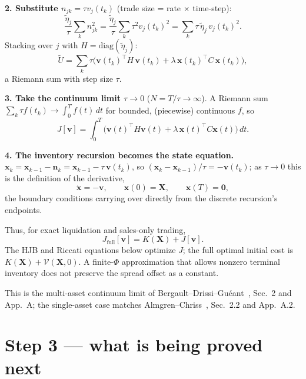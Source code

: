 \documentclass[11pt,a4paper]{article}
\begin{document}
\textbf{2. Substitute $n_{jk}=\tau v_j(t_k)$} (trade size = rate $\times$
time-step):
\[
\frac{\tilde\eta_j}{\tau}\sum_kn_{jk}^2=\frac{\tilde\eta_j}{\tau}\sum_k\tau^2
v_j(t_k)^2=\sum_k\tau\,\tilde\eta_j\,v_j(t_k)^2 .
\]
Stacking over $j$ with $H=\mathrm{diag}(\tilde\eta_j)$:
\[
\tilde U=\sum_k\tau\Big(\mathbf v(t_k)^\top H\,\mathbf v(t_k)+\lambda\,\mathbf
x(t_k)^\top C\,\mathbf x(t_k)\Big),
\]
a Riemann sum with step size $\tau$.

\textbf{3. Take the continuum limit $\tau\to0$} ($N=T/\tau\to\infty$). A
Riemann sum $\sum_k\tau f(t_k)\to\int_0^Tf(t)\,dt$ for bounded, (piecewise)
continuous $f$, so
\begin{equation}
J[\mathbf v]=\int_0^T\big(\mathbf v(t)^\top H\mathbf v(t)+\lambda\,\mathbf
x(t)^\top C\mathbf x(t)\big)\,dt .
\label{eq:J}
\end{equation}

\textbf{4. The inventory recursion becomes the state equation.}
$\mathbf x_k=\mathbf x_{k-1}-\mathbf n_k=\mathbf x_{k-1}-\tau\,\mathbf v(t_k)$,
so $(\mathbf x_k-\mathbf x_{k-1})/\tau=-\mathbf v(t_k)$; as $\tau\to0$ this is
the definition of the derivative,
\begin{equation}
\dot{\mathbf x}=-\mathbf v,\qquad \mathbf x(0)=\mathbf X,\qquad
\mathbf x(T)=\mathbf 0,
\label{eq:state}
\end{equation}
the boundary conditions carrying over directly from the discrete recursion's
endpoints.

Thus, for exact liquidation and sales-only trading,
\begin{equation}
J_{\mathrm{full}}[\mathbf v]=K(\mathbf X)+J[\mathbf v].
\end{equation}
The HJB and Riccati equations below optimize $J$; the full optimal initial cost
is $K(\mathbf X)+\mathcal V(\mathbf X,0)$. A finite-$\Phi$ approximation that
allows nonzero terminal inventory does not preserve the spread offset as a
constant.

This is the multi-asset continuum limit of
Bergault--Drissi--Gu\'eant~\cite{bergault2022}, Sec.~2 and App.~A; the
single-asset case matches Almgren--Chriss~\cite{almgrenchriss2000},
Sec.~2.2 and App.~A.2.

\section*{Step 3 --- what is being proved next}
\end{document}
